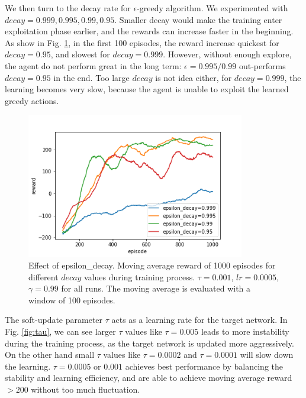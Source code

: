\documentclass[conference]{IEEEtran}
\begin{document}
We then turn to the decay rate for $\epsilon$-greedy algorithm. We experimented with $decay = 0.999, 0.995, 0.99, 0.95$. Smaller decay would make the training enter exploitation phase earlier, and the rewards can increase faster in the beginning. As show in Fig. \ref{fig:epsilon_decay}, in the first 100 episodes, the reward increase quickest for $decay = 0.95$, and slowest for $decay = 0.999$. However, without enough explore, the agent do not perform great in the long term: $\epsilon = 0.995/0.99$ out-performs $decay = 0.95$ in the end. Too large $decay$ is not idea either, for $decay = 0.999$, the learning becomes very slow, because the agent is unable to exploit the learned greedy actions.

	\begin{figure}
		\includegraphics[height=2.5in]{figures/epsilon_decay.png} 
		\caption{Effect of epsilon\_decay. Moving average reward of 1000 episodes for different $decay$ values during training process. $\tau=0.001$, $lr=0.0005$, $\gamma=0.99$ for all runs. The moving average is evaluated with a window of 100 episodes.}
		\label{fig:epsilon_decay}
	\end{figure}
	
The soft-update parameter $\tau$ acts as a learning rate for the target network. In Fig. \ref{fig:tau}, we can see larger $\tau$ values like $\tau=0.005$ leads to more instability during the training process, as the target network is updated more aggressively. On the other hand small $\tau$ values like $\tau=0.0002$ and $\tau=0.0001$ will slow down the learning. $\tau=0.0005$ or $0.001$ achieves best performance by balancing the stability and learning efficiency, and are able to achieve moving average reward $> 200$ without too much fluctuation.
\end{document}
